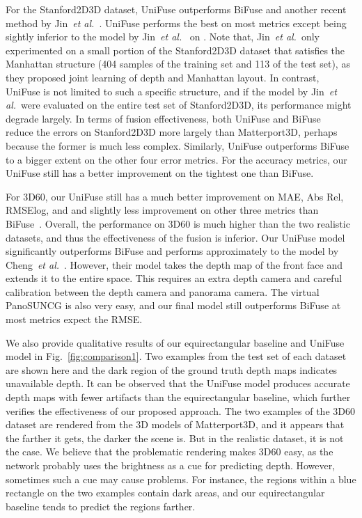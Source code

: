 \documentclass[letterpaper, 10 pt, conference]{ieeeconf}
\def\etal{\emph{et al.}}
\begin{document}
For the Stanford2D3D dataset, UniFuse outperforms BiFuse and another recent method by Jin~\etal~\cite{jin2020geometric}. UniFuse performs the best on most metrics except being sightly inferior to the model by Jin~\etal~\cite{jin2020geometric} on . Note that, Jin~\etal~only experimented on a small portion of the Stanford2D3D dataset that satisfies the Manhattan structure (404 samples of the training set and 113 of the test set), as they proposed joint learning of  depth and Manhattan layout. In contrast, UniFuse is not limited to such a specific structure, and if the model by Jin~\etal \ were evaluated on the entire test set of Stanford2D3D, its performance might degrade largely. In terms of fusion effectiveness, both UniFuse and BiFuse~\cite{wang2020bifuse} reduce the errors on Stanford2D3D more largely than Matterport3D, perhaps because the former is much less complex. Similarly, UniFuse outperforms BiFuse to a bigger extent on the other four error metrics. For the accuracy metrics, our UniFuse still has a better improvement on the tightest one than BiFuse. 

For 3D60, our UniFuse still has a much better improvement on MAE, Abs Rel, RMSElog, and  and slightly less improvement on other three metrics than BiFuse~\cite{wang2020bifuse}. Overall, the performance on 3D60 is much higher than the two realistic datasets, and thus the effectiveness of the fusion is inferior. Our UniFuse model significantly outperforms BiFuse and performs approximately to the model by Cheng~\etal~\cite{cheng2020ode}. However, their model takes the depth map of the front face and extends it to the entire  space. This requires an extra depth camera and careful calibration between the depth camera and panorama camera. 
The virtual PanoSUNCG is also very easy, and our final model still outperforms BiFuse at most metrics expect the RMSE.


We also provide qualitative results of our equirectangular baseline and UniFuse model in Fig.~\ref{fig:comparison1}. Two examples from the test set of each dataset are shown here and the dark region of the ground truth depth maps indicates unavailable depth. It can be observed that the UniFuse model produces accurate depth maps with fewer artifacts than the equirectangular baseline, which further verifies the effectiveness of our proposed approach. 
The two examples of the 3D60 dataset are rendered from the 3D models of Matterport3D, and it appears that the farther it gets, the darker the scene is. But in the realistic dataset, it is not the case. We believe that the problematic rendering makes 3D60 easy, as the network probably uses the brightness as a cue for predicting depth. However, sometimes such a cue may cause problems. For instance, the regions within a blue rectangle on the two examples contain dark areas, and our equirectangular baseline tends to predict the regions farther. 
\end{document}
